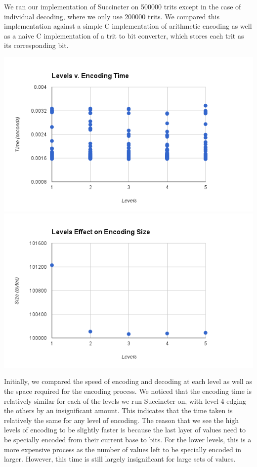\documentclass{article}
\begin{document}
We ran our implementation of Succincter on 500000 trits except in the case of individual decoding, where we only use 200000 trits. We compared this implementation against a simple C implementation of arithmetic encoding as well as a naive C implementation of a trit to bit converter, which stores each trit as its corresponding bit.

\includegraphics[scale=0.4]{images/betterlevel_v_encode}
\includegraphics[scale=0.4]{images/lvl_encodingsize}
\afterpage{\vfill}

Initially, we compared the speed of encoding and decoding at each level as well as the space required for the encoding process. We noticed that the encoding time is relatively similar for each of the levels we run Succincter on, with level 4 edging the others by an insignificant amount. This indicates that the time taken is relatively the same for any level of encoding. The reason that we see the high levels of encoding to be slightly faster is because the last layer of values need to be specially encoded from their current base to bits. For the lower levels, this is a more expensive process as the number of values left to be specially encoded in larger. However, this time is still largely insignificant for large sets of values. \\
\end{document}
